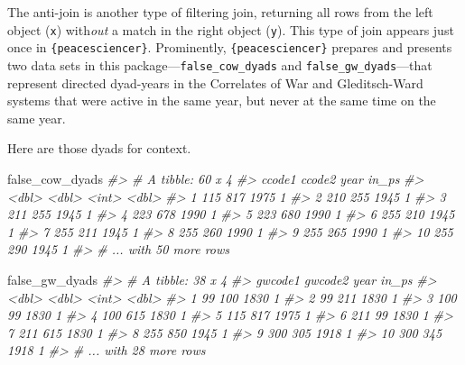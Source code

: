 \documentclass[
  11pt,
]{article}
\newenvironment{Shaded}{\begin{snugshade}}{\end{snugshade}}
\newcommand{\CommentTok}[1]{\textcolor[rgb]{0.56,0.35,0.01}{\textit{#1}}}
\newcommand{\NormalTok}[1]{#1}
\begin{document}
The anti-join is another type of filtering join, returning all rows from the left object (\texttt{x}) with\emph{out} a match in the right object (\texttt{y}). This type of join appears just once in \texttt{\{peacesciencer\}}. Prominently, \texttt{\{peacesciencer\}} prepares and presents two data sets in this package---\texttt{false\_cow\_dyads} and \texttt{false\_gw\_dyads}---that represent directed dyad-years in the Correlates of War and Gleditsch-Ward systems that were active in the same year, but never at the same time on the same year.

Here are those dyads for context.

\begin{Shaded}
\begin{Highlighting}[]
\NormalTok{false\_cow\_dyads}
\CommentTok{\#\textgreater{} \# A tibble: 60 x 4}
\CommentTok{\#\textgreater{}    ccode1 ccode2  year in\_ps}
\CommentTok{\#\textgreater{}     \textless{}dbl\textgreater{}  \textless{}dbl\textgreater{} \textless{}int\textgreater{} \textless{}dbl\textgreater{}}
\CommentTok{\#\textgreater{}  1    115    817  1975     1}
\CommentTok{\#\textgreater{}  2    210    255  1945     1}
\CommentTok{\#\textgreater{}  3    211    255  1945     1}
\CommentTok{\#\textgreater{}  4    223    678  1990     1}
\CommentTok{\#\textgreater{}  5    223    680  1990     1}
\CommentTok{\#\textgreater{}  6    255    210  1945     1}
\CommentTok{\#\textgreater{}  7    255    211  1945     1}
\CommentTok{\#\textgreater{}  8    255    260  1990     1}
\CommentTok{\#\textgreater{}  9    255    265  1990     1}
\CommentTok{\#\textgreater{} 10    255    290  1945     1}
\CommentTok{\#\textgreater{} \# ... with 50 more rows}

\NormalTok{false\_gw\_dyads}
\CommentTok{\#\textgreater{} \# A tibble: 38 x 4}
\CommentTok{\#\textgreater{}    gwcode1 gwcode2  year in\_ps}
\CommentTok{\#\textgreater{}      \textless{}dbl\textgreater{}   \textless{}dbl\textgreater{} \textless{}int\textgreater{} \textless{}dbl\textgreater{}}
\CommentTok{\#\textgreater{}  1      99     100  1830     1}
\CommentTok{\#\textgreater{}  2      99     211  1830     1}
\CommentTok{\#\textgreater{}  3     100      99  1830     1}
\CommentTok{\#\textgreater{}  4     100     615  1830     1}
\CommentTok{\#\textgreater{}  5     115     817  1975     1}
\CommentTok{\#\textgreater{}  6     211      99  1830     1}
\CommentTok{\#\textgreater{}  7     211     615  1830     1}
\CommentTok{\#\textgreater{}  8     255     850  1945     1}
\CommentTok{\#\textgreater{}  9     300     305  1918     1}
\CommentTok{\#\textgreater{} 10     300     345  1918     1}
\CommentTok{\#\textgreater{} \# ... with 28 more rows}
\end{Highlighting}
\end{Shaded}
\end{document}
